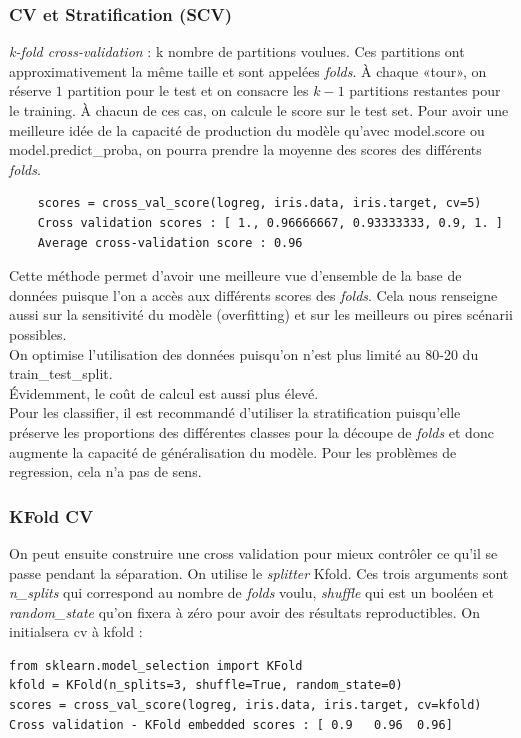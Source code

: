 \documentclass[a4paper,12pt]{report}
\newcommand\bk{\color{black}}
\numberwithin{equation}{section} %
\begin{document}
\subsubsection{CV et Stratification (SCV)}
\textit{k-fold cross-validation} : k nombre de partitions voulues. Ces partitions ont approximativement la même taille et sont appelées \textit{folds}. À chaque «tour», on réserve $1$ partition pour le test et on consacre les $k-1$ partitions restantes pour le training.
À chacun de ces cas, on calcule le score sur le test set. Pour avoir une meilleure idée de la capacité de production du modèle qu'avec model.score ou model.predict\_proba, on pourra prendre la moyenne des scores des différents \textit{folds}.
\begin{lstlisting}
	scores = cross_val_score(logreg, iris.data, iris.target, cv=5)	
	Cross validation scores : [ 1., 0.96666667, 0.93333333, 0.9, 1. ]	
	Average cross-validation score : 0.96
\end{lstlisting}

\noindent Cette méthode permet d'avoir une meilleure vue d'ensemble de la base de données puisque l'on a accès aux différents scores des \textit{folds}.
Cela nous renseigne aussi sur la sensitivité du modèle (overfitting) et sur les meilleurs ou pires scénarii possibles.\\
On optimise l'utilisation des données puisqu'on n'est plus limité au 80-20 du train\_test\_split.\\
Évidemment, le coût de calcul est aussi plus élevé. \\
Pour les classifier, il est recommandé d'utiliser la stratification puisqu'elle préserve les proportions des différentes classes pour la découpe de \textit{folds} et donc augmente la capacité de généralisation du modèle. Pour les problèmes de regression, cela n'a pas de sens.\\

\subsubsection{KFold CV}
On peut ensuite construire une cross validation pour mieux contrôler ce qu'il se passe pendant la séparation.
On utilise le \textit{splitter} Kfold. Ces trois arguments sont \color{red}\textit{n\_splits} \bk qui correspond au nombre de \textit{folds} voulu, \color{red} \textit{shuffle} \bk qui est un booléen et \color{red}\textit{random\_state} \bk qu'on fixera à zéro pour avoir des résultats reproductibles. On initialsera \color{red} cv \bk à kfold :
\begin{lstlisting}
from sklearn.model_selection import KFold
kfold = KFold(n_splits=3, shuffle=True, random_state=0)
scores = cross_val_score(logreg, iris.data, iris.target, cv=kfold)
Cross validation - KFold embedded scores : [ 0.9   0.96  0.96]
\end{lstlisting}
\end{document}
